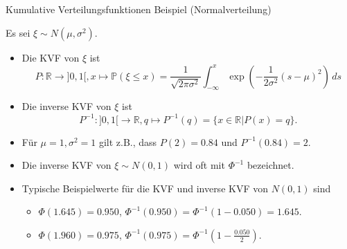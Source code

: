 \documentclass[
  8pt,
  ignorenonframetext,
]{beamer}
\begin{document}
\begin{frame}{Kumulative Verteilungsfunktionen}
\protect\hypertarget{kumulative-verteilungsfunktionen-12}{}
Beispiel (Normalverteilung) \vspace{2mm}

\small
\justifying

Es sei \(\xi \sim N(\mu,\sigma^2)\).

\begin{itemize}
\item Die KVF von $\xi$ ist
\begin{equation}
P : \mathbb{R} \to ]0,1[, x \mapsto \mathbb{P}(\xi \le x)
= \frac{1}{\sqrt{2\pi\sigma^2}}\int_{-\infty}^x\exp\left(-\frac{1}{2\sigma^2}(s-\mu)^2\right) \,ds
\end{equation}

\item Die inverse KVF von $\xi$ ist
\begin{equation}
P^{-1} : ]0,1[ \to \mathbb{R}, q \mapsto P^{-1}(q) = \{x \in \mathbb{R}|P(x) = q\}.
\end{equation}

\item Für $\mu = 1, \sigma^2 = 1$ gilt z.B., dass $P(2) = 0.84$ und $P^{-1}(0.84) = 2$.

\item Die inverse KVF von $\xi \sim N(0,1)$ wird oft mit $\Phi^{-1}$ bezeichnet.

\item Typische Beispielwerte für die KVF und inverse KVF  von $N(0,1)$ sind
\begin{itemize}
\footnotesize
\item $\Phi(1.645) = 0.950$, $\Phi^{-1}(0.950) = \Phi^{-1}(1 -0.050) = 1.645$.
\item $\Phi(1.960) = 0.975$, $\Phi^{-1}(0.975) = \Phi^{-1}(1 - \frac{0.050}{2})$.

\end{itemize}
\end{itemize}
\end{frame}
\end{document}
